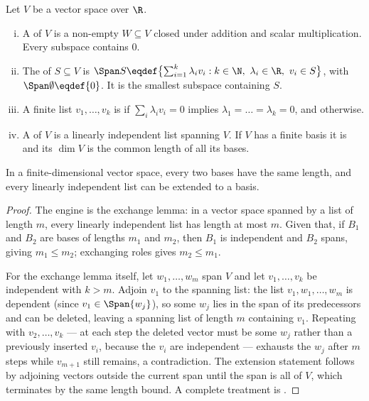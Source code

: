 \begin{definition}\label{def:span-basis}
	Let $V$ be a vector space over $\R$.
	\begin{enumerate}[(i)]
		\item A  of $V$ is a non-empty $W\subseteq V$ closed under
		      addition and scalar multiplication. Every subspace contains $0$.
		\item The  of $S\subseteq V$ is
		      $\Span S\eqdef\bigl\{\sum_{i=1}^k\lambda_iv_i : k\in\N,\ \lambda_i\in\R,\
			      v_i\in S\bigr\}$, with $\Span\emptyset\eqdef\{0\}$. It is the smallest
		      subspace containing $S$.
		\item A finite list $v_1,\dots,v_k$ is  if $\sum_i\lambda_iv_i=0$ implies
		      $\lambda_1=\dots=\lambda_k=0$, and  otherwise.
		\item A  of $V$ is a linearly independent list spanning $V$. If $V$
		      has a finite basis it is  and its  $\dim V$ is the common length of all its
		      bases.
	\end{enumerate}
\end{definition}

\begin{theorem}\label{thm:dimension-well-defined}
	In a finite-dimensional vector space, every two bases have the same length, and
	every linearly independent list can be extended to a basis.
\end{theorem}

\begin{proof}
	The engine is the exchange lemma: in a vector space spanned by a list of length
	$m$, every linearly independent list has length at most $m$. Given that, if
	$B_1$ and $B_2$ are bases of lengths $m_1$ and $m_2$, then $B_1$ is independent
	and $B_2$ spans, giving $m_1\leq m_2$; exchanging roles gives $m_2\leq m_1$.

	For the exchange lemma itself, let $w_1,\dots,w_m$ span $V$ and let
	$v_1,\dots,v_k$ be independent with $k>m$. Adjoin $v_1$ to the spanning list:
	the list $v_1,w_1,\dots,w_m$ is dependent (since $v_1\in\Span\{w_j\}$), so some
	$w_j$ lies in the span of its predecessors and can be deleted, leaving a
	spanning list of length $m$ containing $v_1$. Repeating with
	$v_2,\dots,v_k$ --- at each step the deleted vector must be some $w_j$ rather
	than a previously inserted $v_i$, because the $v_i$ are independent --- exhausts
	the $w_j$ after $m$ steps while $v_{m+1}$ still remains, a contradiction. The
	extension statement follows by adjoining vectors outside the current span until
	the span is all of $V$, which terminates by the same length bound. A complete
	treatment is \textcite[Ch.~2]{axler2024linear}.
\end{proof}

